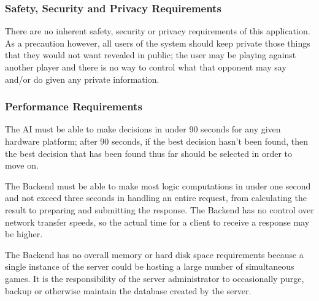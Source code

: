 \documentclass[twoside,letterpaper]{article}
\begin{document}
\subsubsection{Safety, Security and Privacy Requirements}
There are no inherent safety, security or privacy requirements of this application.  As a precaution however, all users of the system should keep private those things that they would not want revealed in public; the user may be playing against another player and there is no way to control what that opponent may say and/or do given any private information.

\subsubsection{Performance Requirements}

The AI must be able to make decisions in under 90 seconds for any given hardware platform; after 90 seconds, if the best decision hasn't been found, then the best decision that has been found thus far should be selected in order to move on.

The Backend must be able to make most logic computations in under one second and not exceed three seconds in handling an entire request, from calculating the result to preparing and submitting the response.  The Backend has no control over network transfer speeds, so the actual time for a client to receive a response may be higher.

The Backend has no overall memory or hard disk space requirements because a single instance of the server could be hosting a large number of simultaneous games.  It is the responsibility of the server administrator to occasionally purge, backup or otherwise maintain the database created by the server.
\end{document}
